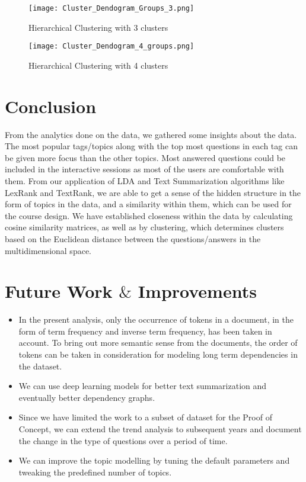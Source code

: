 \documentclass[journal]{IEEEtran}
\begin{document}
\begin{figure}[!htb]
\begin{center}
\texttt{[image: Cluster\_Dendogram\_Groups\_3.png]}
\end{center}
\caption{Hierarchical Clustering with 3 clusters}
\end{figure}

\begin{figure}[!htb]
\begin{center}
\texttt{[image: Cluster\_Dendogram\_4\_groups.png]}
\end{center}
\caption{Hierarchical Clustering with 4 clusters}
\end{figure}

\section{Conclusion}
From the analytics done on the data, we gathered some insights about the data. The most popular tags/topics along with the top most questions in each tag can be given more focus than the other topics. Most answered questions could be included in the interactive sessions as most of the users are comfortable with them. From our application of LDA and Text Summarization algorithms like LexRank and TextRank, we are able to get a sense of the hidden structure in the form of topics in the data, and a similarity within them, which can be used for the course design. We have established closeness within the data by calculating cosine similarity matrices, as well as by clustering, which determines clusters based on the Euclidean distance between the questions/answers in the multidimensional space.


\section{Future Work $\&$ Improvements}
\begin{itemize}
\item In the present analysis, only the occurrence of tokens in a document, in the form of term frequency and inverse term frequency, has been taken in account. To bring out more semantic sense from the documents, the order of tokens can be taken in consideration for modeling long term dependencies in the dataset.
\item We can use deep learning models for better text summarization and eventually better dependency graphs. 
\item Since we have limited the work to a subset of dataset for the Proof of Concept, we can extend the trend analysis to subsequent years and document the change in the type of questions over a period of time.
\item We can improve the topic modelling by tuning the default parameters and tweaking the predefined number of topics.
\end{itemize}
\end{document}

